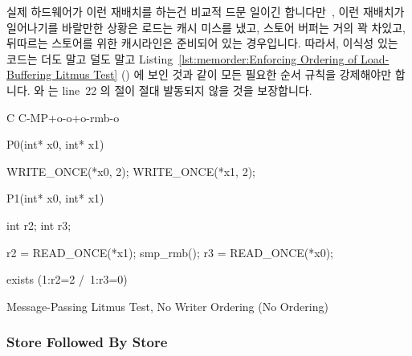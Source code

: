 실제 하드웨어가 이런 재배치를 하는건 비교적 드문
일이긴 합니다만~\cite{LucMaranget2017aarch64},
이런 재배치가 일어나기를 바랄만한 상황은 로드는 캐시 미스를 냈고, 스토어 버퍼는
거의 꽉 차있고, 뒤따르는 스토어를 위한 캐시라인은 준비되어 있는 경우입니다.
따라서, 이식성 있는 코드는 더도 말고 덜도 말고
Listing~\ref{lst:memorder:Enforcing Ordering of Load-Buffering Litmus Test}
()
에 보인 것과 같이 모든 필요한 순서 규칙을 강제해야만 합니다.
 와  는 line~22 의 
절이 절대 발동되지 않을 것을 보장합니다.

\begin{listing}[tbp]
{ \scriptsize
\begin{verbbox}[\LstLineNo]
C C-MP+o-o+o-rmb-o

{
}

P0(int* x0, int* x1) {

  WRITE_ONCE(*x0, 2);
  WRITE_ONCE(*x1, 2);

}

P1(int* x0, int* x1) {

  int r2;
  int r3;

  r2 = READ_ONCE(*x1);
  smp_rmb();
  r3 = READ_ONCE(*x0);

}

exists (1:r2=2 /\ 1:r3=0)
\end{verbbox}
}
\centering
\theverbbox
\caption{Message-Passing Litmus Test, No Writer Ordering (No Ordering)}
\label{lst:memorder:Message-Passing Litmus Test, No Writer Ordering (No Ordering)}
\end{listing}

\subsubsection{Store Followed By Store}
\label{sec:memorder:Store Followed By Store}

